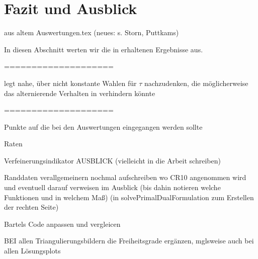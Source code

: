 \section{Fazit und Ausblick}

aus altem Auswertungen.tex (neues: s. Storn, Puttkams)

In diesen Abschnitt werten wir die in  erhaltenen
Ergebnisse aus.


====================

 legt nahe, über nicht konstante Wahlen für
$\tau$ nachzu\-denken, die mög\-lich\-er\-wei\-se das alternierende Verhalten in
 verhindern könnte

====================

Punkte auf die bei den Auswertungen eingegangen werden sollte

Raten

Verfeinerungsindikator
AUSBLICK (vielleicht in die Arbeit schreiben)
  
  Randdaten verallgemeinern
    nochmal aufschreiben wo CR10 angenommen wird und eventuell darauf verweisen 
    im Ausblick (bis dahin notieren welche Funktionen und in welchem Maß)
    (in solvePrimalDualFormulation zum Erstellen der rechten Seite)
    
  Bartels Code anpassen und vergleicen

BEI allen Triangulierungsbildern die Freiheitsgrade ergänzen, mglsweise auch
bei allen Lösungsplots
